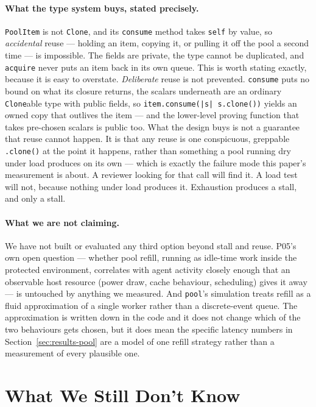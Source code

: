 \documentclass[11pt]{article}
\begin{document}
\paragraph{What the type system buys, stated precisely.} \texttt{PoolItem}
is not \texttt{Clone}, and its \texttt{consume} method takes \texttt{self} by
value, so \emph{accidental} reuse --- holding an item, copying it, or pulling
it off the pool a second time --- is impossible. The fields are private, the
type cannot be duplicated, and \texttt{acquire} never puts an item back in
its own queue. This is worth stating exactly, because it is easy to
overstate. \emph{Deliberate} reuse is not prevented. \texttt{consume} puts no
bound on what its closure returns, the scalars underneath are an ordinary
\texttt{Clone}able type with public fields, so \texttt{item.consume(|s|
s.clone())} yields an owned copy that outlives the item --- and the
lower-level proving function that takes pre-chosen scalars is public too.
What the design buys is not a guarantee that reuse cannot happen. It is that
any reuse is one conspicuous, greppable \texttt{.clone()} at the point it
happens, rather than something a pool running dry under load produces on its
own --- which is exactly the failure mode this paper's measurement is about.
A reviewer looking for that call will find it. A load test will not, because
nothing under load produces it. Exhaustion produces a stall, and only a
stall.

\paragraph{What we are not claiming.} We have not built or evaluated any
third option beyond stall and reuse. P05's own open question --- whether pool
refill, running as idle-time work inside the protected environment,
correlates with agent activity closely enough that an observable host
resource (power draw, cache behaviour, scheduling) gives it away --- is
untouched by anything we measured. And \texttt{pool}'s simulation treats
refill as a fluid approximation of a single worker rather than a
discrete-event queue. The approximation is written down in the code and it
does not change which of the two behaviours gets chosen, but it does mean the
specific latency numbers in Section~\ref{sec:results-pool} are a model of one
refill strategy rather than a measurement of every plausible one.

\section{What We Still Don't Know}
\label{sec:open}
\end{document}
